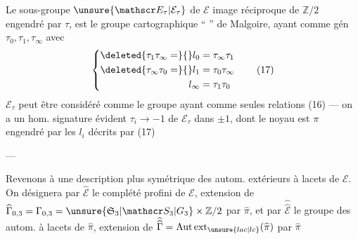 Le sous-groupe $\unsure{\mathscr E_\tau|\mathcal E_\tau}$ de $\mathscr E$ image réciproque de $\mathbb Z/2$ engendré par $\tau$, est le groupe cartographique `` '' de Malgoire, ayant comme gén $\tau_0,\tau_1,\tau_\infty$  avec
\[
\left\{\begin{aligned}
\deleted{\tau_1\tau_\infty=}{ }l_0&=\tau_\infty\tau_1\\
\deleted{\tau_\infty\tau_0=}{ }l_1&=\tau_0\tau_\infty\\
l_\infty&=\tau_1\tau_0
\end{aligned}\right.\tag*{(17)}
\]
$\mathscr E_\tau$ peut être considéré comme le groupe ayant comme  seules relations (16) --- on a un hom. signature évident $\tau_i\to-1$ de $\mathscr E_\tau$ dans $\pm1$, dont le noyau est $\pi$ engendré par les $l_i$ décrits par (17)

\begin{center}---\end{center}
\margin{$\unsure{\rho}$}
Revenons à une description plus symétrique des autom. extérieurs à lacets de $\mathscr E$. On désignera par $\widehat{\mathscr E}$ le complété profini de $\mathscr E$, extension de $\widehat\Gamma_{0,3}=\Gamma_{0,3}=\unsure{\mathfrak S_3|\mathscr S_3|G_3}\times\mathbb Z/2$ par $\widehat\pi$, et par $\widehat{\widehat{\mathscr E}}$ le groupe des autom.  à lacets de $\widehat\pi$, extension de $\widehat{\widehat\Gamma}=\operatorname{Aut}\operatorname{ext}_{\unsure{lac|lc}}(\widehat\pi)$ par $\widehat\pi$
